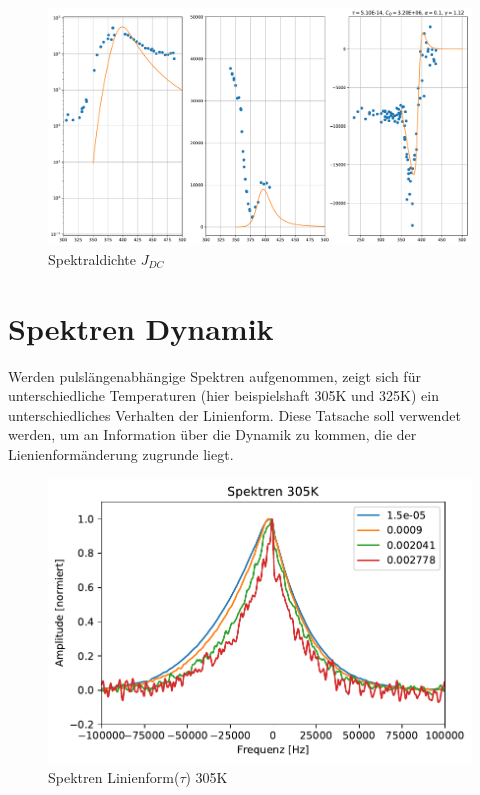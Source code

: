 \begin{figure}
	\begin{center}
		\includegraphics[width=\textwidth]{graphics/plots/THEO/J_dc_01.pdf}
	\end{center}
	\caption{Spektraldichte $J_{DC}$} \label{fig:res:theorie_j_dc}
\end{figure}




\section{Spektren Dynamik} \label{section:res:spekdyn}

Werden pulslängenabhängige Spektren aufgenommen, zeigt sich für unterschiedliche Temperaturen (hier beispielshaft 305K und 325K) ein unterschiedliches Verhalten der Linienform. Diese Tatsache soll verwendet werden, um an Information über die Dynamik zu kommen, die der Lienienformänderung zugrunde liegt.

\begin{figure}
	\begin{center}
		\includegraphics[width=\textwidth]{graphics/plots/SPEKDYN/spekdyn_305K.pdf}
	\end{center}
	\caption{Spektren Linienform($\tau$) 305K} \label{fig:res:spekdyn_305K}
\end{figure}

